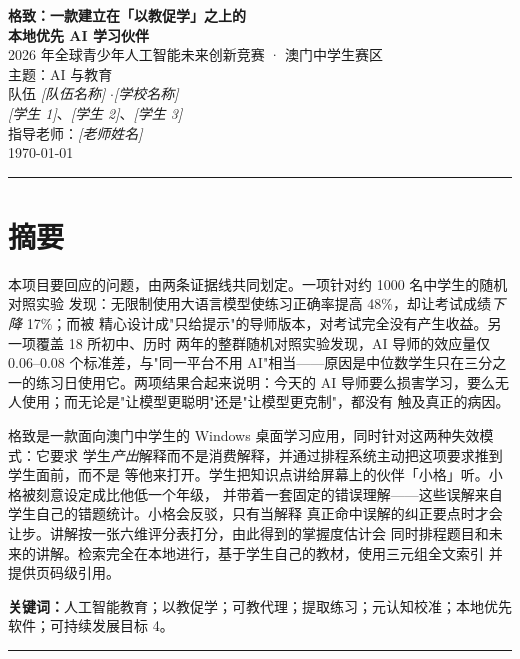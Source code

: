 \documentclass[11pt,a4paper,UTF8,fontset=windows]{ctexart}
\begin{document}
\begin{center}
{\LARGE\bfseries 格致：一款建立在「以教促学」之上的\\[3pt]
本地优先 AI 学习伙伴}\\[7pt]
{\small 2026 年全球青少年人工智能未来创新竞赛 · 澳门中学生赛区\\
主题：AI 与教育}\\[4pt]
{\footnotesize
队伍 \textit{[队伍名称]} \quad$\cdot$\quad \textit{[学校名称]}\\[2pt]
\textit{[学生 1]}、\textit{[学生 2]}、\textit{[学生 3]}\\
指导老师：\textit{[老师姓名]}\\[2pt]
\today}
\end{center}
\vspace{-4pt}
\hrule
\vspace{6pt}

\section*{摘要}

本项目要回应的问题，由两条证据线共同划定。一项针对约 1000 名中学生的随机对照实验
发现：无限制使用大语言模型使练习正确率提高 48\%，却让考试成绩\emph{下降} 17\%；而被
精心设计成"只给提示"的导师版本，对考试完全没有产生收益。另一项覆盖 18 所初中、历时
两年的整群随机对照实验发现，AI 导师的效应量仅 0.06--0.08 个标准差，与"同一平台不用
AI"相当——原因是中位数学生只在三分之一的练习日使用它。两项结果合起来说明：今天的
AI 导师要么损害学习，要么无人使用；而无论是"让模型更聪明"还是"让模型更克制"，都没有
触及真正的病因。

格致是一款面向澳门中学生的 Windows 桌面学习应用，同时针对这两种失效模式：它要求
学生\emph{产出}解释而不是消费解释，并通过排程系统主动把这项要求推到学生面前，而不是
等他来打开。学生把知识点讲给屏幕上的伙伴「小格」听。小格被刻意设定成比他低一个年级，
并带着一套固定的错误理解——这些误解来自学生自己的错题统计。小格会反驳，只有当解释
真正命中误解的纠正要点时才会让步。讲解按一张六维评分表打分，由此得到的掌握度估计会
同时排程题目和未来的讲解。检索完全在本地进行，基于学生自己的教材，使用三元组全文索引
并提供页码级引用。

\textbf{关键词：}人工智能教育；以教促学；可教代理；提取练习；元认知校准；本地优先
软件；可持续发展目标 4。

\vspace{4pt}
\hrule
\end{document}
